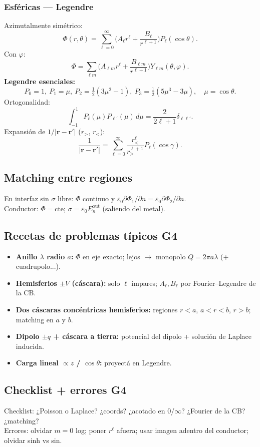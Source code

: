 \documentclass[10pt,a4paper]{article}
\newcommand{\vect}[1]{\mathbf{#1}}
\newcommand{\epso}{\varepsilon_0}
\begin{document}
\subsubsection{Esféricas --- Legendre}
Azimutalmente simétrico:
\[
\Phi(r,\theta)=\sum_{\ell=0}^\infty\!\Big(A_\ell r^\ell+\frac{B_\ell}{r^{\ell+1}}\Big)P_\ell(\cos\theta).
\]
Con $\varphi$:
\[
\Phi=\sum_{\ell m}\!\Big(A_{\ell m}r^\ell+\frac{B_{\ell m}}{r^{\ell+1}}\Big)Y_{\ell m}(\theta,\varphi).
\]
\textbf{Legendre esenciales:}
\[
P_0=1,\ P_1=\mu,\ P_2=\tfrac12(3\mu^2-1),\ P_3=\tfrac12(5\mu^3-3\mu),\quad\mu=\cos\theta.
\]
Ortogonalidad:
\[
\int_{-1}^1 P_\ell(\mu)P_{\ell'}(\mu)\,d\mu=\frac{2}{2\ell+1}\delta_{\ell\ell'}.
\]
Expansión de $1/|\vect{r}-\vect{r}'|$ ($r_>$, $r_<$):
\[
\frac{1}{|\vect{r}-\vect{r}'|}=\sum_{\ell=0}^\infty\frac{r_<^\ell}{r_>^{\ell+1}}P_\ell(\cos\gamma).
\]

\subsection{Matching entre regiones}
En interfaz sin $\sigma$ libre: $\Phi$ continuo y $\epso\partial\Phi_1/\partial n=\epso\partial\Phi_2/\partial n$.\\
Conductor: $\Phi=\mathrm{cte}$; $\sigma=\epso E_n^{\mathrm{out}}$ (saliendo del metal).

\subsection{Recetas de problemas típicos G4}
\begin{itemize}
\item \textbf{Anillo $\lambda$ radio $a$:} $\Phi$ en eje exacto; lejos $\to$ monopolo $Q=2\pi a\lambda$ (+ cuadrupolo...).
\item \textbf{Hemisferios $\pm V$ (cáscara):} solo $\ell$ impares; $A_\ell,B_\ell$ por Fourier--Legendre de la CB.
\item \textbf{Dos cáscaras concéntricas hemisferios:} regiones $r<a$, $a<r<b$, $r>b$; matching en $a$ y $b$.
\item \textbf{Dipolo $\pm q$ + cáscara a tierra:} potencial del dipolo + solución de Laplace inducida.
\item \textbf{Carga lineal $\propto z$ / $\cos\theta$:} proyectá en Legendre.
\end{itemize}

\subsection{Checklist + errores G4}
Checklist: ¿Poisson o Laplace? ¿coords? ¿acotado en 0/$\infty$? ¿Fourier de la CB? ¿matching?\\
Errores: olvidar $m=0$ log; poner $r^\ell$ afuera; usar imagen adentro del conductor; olvidar sinh vs sin.
\end{document}
